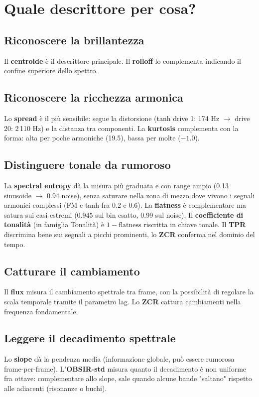 \documentclass[a4paper,11pt]{article}
\begin{document}
\section{Quale descrittore per cosa?}

\subsection{Riconoscere la brillantezza}
Il \textbf{centroide} è il descrittore principale. Il \textbf{rolloff}
lo complementa indicando il confine superiore dello spettro.

\subsection{Riconoscere la ricchezza armonica}
Lo \textbf{spread} è il più sensibile: segue la distorsione
(tanh drive 1: 174 Hz $\to$ drive 20: 2\,110 Hz) e la distanza
tra componenti. La \textbf{kurtosis} complementa con la forma:
alta per poche armoniche (19.5), bassa per molte ($-1.0$).

\subsection{Distinguere tonale da rumoroso}
La \textbf{spectral entropy} dà la misura più graduata e con range
ampio (0.13 sinusoide $\to$ 0.94 noise), senza saturare nella zona di
mezzo dove vivono i segnali armonici complessi (FM e tanh fra 0.2 e
0.6). La \textbf{flatness} è complementare ma satura sui casi estremi
(0.945 sul bin esatto, 0.99 sul noise). Il \textbf{coefficiente di
tonalità} (in famiglia Tonalità) è $1 - \text{flatness}$ riscritta in
chiave tonale. Il \textbf{TPR} discrimina bene sui segnali a picchi
prominenti, lo \textbf{ZCR} conferma nel dominio del tempo.

\subsection{Catturare il cambiamento}
Il \textbf{flux} misura il cambiamento spettrale tra frame, con la
possibilità di regolare la scala temporale tramite il parametro lag.
Lo \textbf{ZCR} cattura cambiamenti nella frequenza fondamentale.

\subsection{Leggere il decadimento spettrale}
Lo \textbf{slope} dà la pendenza media (informazione globale, può
essere rumorosa frame-per-frame). L'\textbf{OBSIR-std} misura quanto
il decadimento è non uniforme fra ottave: complementare allo slope,
sale quando alcune bande "saltano" rispetto alle adiacenti (risonanze
o buchi).
\end{document}
